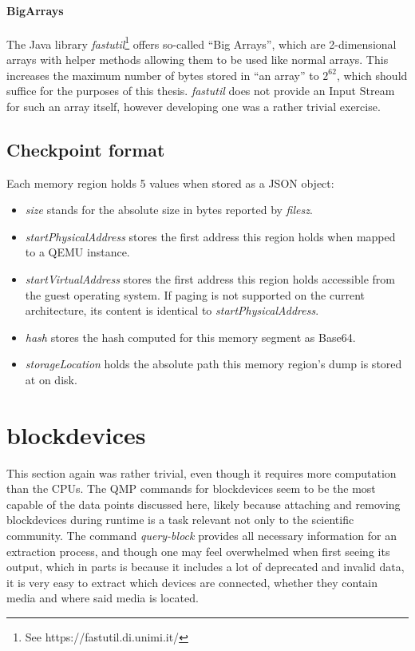\paragraph{BigArrays}
The Java library \emph{fastutil}\footnote{See https://fastutil.di.unimi.it/} offers so-called \enquote{Big Arrays},
which are 2-dimensional arrays with helper methods allowing them to be used like normal arrays.
This increases the maximum number of bytes stored in \enquote{an array} to $2^{62}$,
which should suffice for the purposes of this thesis.
\emph{fastutil} does not provide an Input Stream for such an array itself,
however developing one was a rather trivial exercise.

\subsection{Checkpoint format}
Each memory region holds 5 values when stored as a JSON object:
\begin{itemize}
    \item \emph{size} stands for the absolute size in bytes reported by \emph{filesz}.
    \item \emph{startPhysicalAddress} stores the first address this region holds when mapped to a QEMU instance.
    \item \emph{startVirtualAddress} stores the first address this region holds accessible from the guest operating system.
    If paging is not supported on the current architecture, its content is identical to \emph{startPhysicalAddress}.
    \item \emph{hash} stores the hash computed for this memory segment as Base64.
    \item \emph{storageLocation} holds the absolute path this memory region's dump is stored at on disk.
\end{itemize}

\section{blockdevices}
This section again was rather trivial, even though it requires more computation than the CPUs.
The QMP commands for blockdevices seem to be the most capable of the data points discussed here,
likely because attaching and removing blockdevices during runtime is a task relevant not only to the scientific community.
The command \emph{query-block} provides all necessary information for an extraction process,
and though one may feel overwhelmed when first seeing its output,
which in parts is because it includes a lot of deprecated and invalid data,
it is very easy to extract which devices are connected, whether they contain media and where said media is located.

